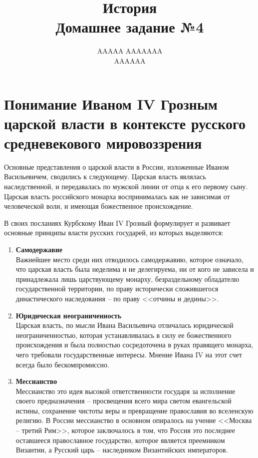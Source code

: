 \documentclass[12pt]{article}
\title{История \\ Домашнее задание №4}
\author{AAAAA AAAAAAA \\ AAAAAA}
\newcommand{\red}[1]{{\color{red}{#1}}}
\begin{document}
  \maketitle
  \setcounter{section}{1}

  \section{Понимание Иваном IV Грозным царской власти в контексте русского средневекового мировоззрения}

  Основные представления о царской власти в России, изложенные Иваном Васильевичем, сводились к следующему.
  Царская власть являлась наследственной, и передавалась по мужской линии от отца к его первому сыну.
  Царская власть российского монарха воспринималась как не зависимая от человеческой воли, и имеющая божественное происхождение.

  В своих посланиях Курбскому Иван IV Грозный формулирует и развивает основные принципы власти русских государей, из которых выделяются:

  \begin{enumerate}[label=\textbf{\large\arabic*}]
    \item {\bf\large Самодержавие} \\
    Важнейшее место среди них отводилось самодержавию, которое означало,
    что царская власть была неделима и не делегируема, ни от кого не зависела и принадлежала лишь царствующему монарху,
    безраздельному обладателю государственной территории,
    по праву исторически сложившегося династического наследования -- по праву <<отчины и дедины>>.

    \item {\bf\large Юридическая неограниченность} \\
    Царская власть, по мысли Ивана Васильевича отличалась юридической неограниченностью,
    которая устанавливалась в силу ее божественного происхождения и была полностью сосредоточена в руках правящего монарха,
    чего требовали государственные интересы.
    Мнение Ивана IV на этот счет всегда было бескомпромиссно.

    \item {\bf\large Мессианство} \\
    Мессианство это идея высокой ответственности государя за исполнение своего предназначения --
    просвещения всего мира светом евангельской истины, сохранение чистоты веры и превращение православия во вселенскую религию.
    В России мессианство в основном опиралось на учение <<Москва -- третий Рим>>, которое заключалось в том, что
    Россия это последнее оставшееся православное государство, которое является преемником Византии,
    а Русский царь -- наследником Византийских императоров.
  \end{enumerate}
\end{document}

